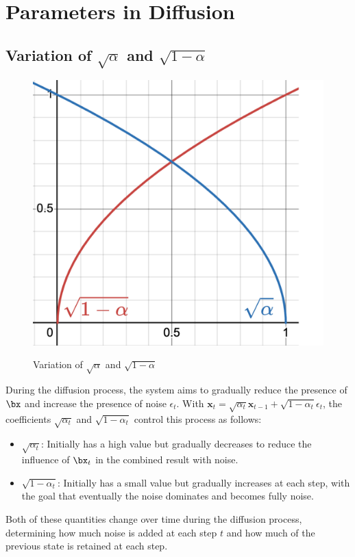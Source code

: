 
\section{Parameters in Diffusion}
\label{appendix:Appendix1}

\subsection{Variation of $\sqrt{\alpha}$ and $\sqrt{1 - \alpha}$}

\begin{figure}[h]
	\includegraphics[width=0.5\linewidth]{images/SquareAlpha}
	\label{fig:wrapfig}
	\caption{Variation of $\sqrt{\alpha}$ and $\sqrt{1 - \alpha}$}
\end{figure}

During the diffusion process, the system aims to gradually reduce the presence of $\bx$ and increase the presence of noise $\epsilon_t$. With $\mathbf{x}_{t} = \sqrt{\alpha_t} \mathbf{x}_{t-1} + \sqrt{1 - \alpha_t} \epsilon_t$, the coefficients $\sqrt{\alpha_t}$ and $\sqrt{1 - \alpha_t}$ control this process as follows:

\begin{itemize}
	\item $\sqrt{\alpha_t}$: Initially has a high value but gradually decreases to reduce the influence of $\bx_t$ in the combined result with noise.
	\item $\sqrt{1 - \alpha_t}$: Initially has a small value but gradually increases at each step, with the goal that eventually the noise dominates and becomes fully noise.
\end{itemize}

Both of these quantities change over time during the diffusion process, determining how much noise is added at each step $t$ and how much of the previous state is retained at each step.


